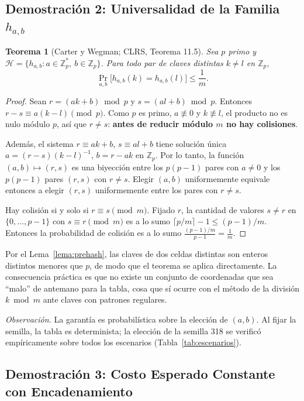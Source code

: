 \documentclass[11pt,a4paper]{article}
\newtheorem{teorema}{Teorema}
\theoremstyle{definition}
\begin{document}
\subsection{Demostración 2: Universalidad de la Familia $h_{a,b}$}

\begin{teorema}[Carter y Wegman; CLRS, Teorema 11.5]\label{teo:universal}
Sea $p$ primo y $\mathcal{H}=\{h_{a,b} : a\in\mathbb{Z}_p^\ast,\ b\in\mathbb{Z}_p\}$. Para todo par de claves distintas $k\neq l$ en $\mathbb{Z}_p$,
\[ \Pr_{a,b}\bigl[h_{a,b}(k)=h_{a,b}(l)\bigr]\le\frac{1}{m}. \]
\end{teorema}
\begin{proof}
Sean $r=(ak+b)\bmod p$ y $s=(al+b)\bmod p$. Entonces $r-s\equiv a(k-l)\pmod p$. Como $p$ es primo, $a\not\equiv0$ y $k\not\equiv l$, el producto no es nulo módulo $p$, así que $r\neq s$: \textbf{antes de reducir módulo $m$ no hay colisiones}.

Además, el sistema $r\equiv ak+b$, $s\equiv al+b$ tiene solución única $a=(r-s)(k-l)^{-1}$, $b=r-ak$ en $\mathbb{Z}_p$. Por lo tanto, la función $(a,b)\mapsto(r,s)$ es una biyección entre los $p(p-1)$ pares con $a\neq0$ y los $p(p-1)$ pares $(r,s)$ con $r\neq s$. Elegir $(a,b)$ uniformemente equivale entonces a elegir $(r,s)$ uniformemente entre los pares con $r\ne s$.

Hay colisión si y solo si $r\equiv s\pmod m$. Fijado $r$, la cantidad de valores $s\neq r$ en $\{0,\dots,p-1\}$ con $s\equiv r\pmod m$ es a lo sumo $\lceil p/m\rceil-1\le (p-1)/m$. Entonces la probabilidad de colisión es a lo sumo $\frac{(p-1)/m}{p-1}=\frac1m$.
\end{proof}

Por el Lema~\ref{lema:prehash}, las claves de dos celdas distintas son enteros distintos menores que $p$, de modo que el teorema se aplica directamente. La consecuencia práctica es que no existe un conjunto de coordenadas que sea ``malo'' de antemano para la tabla, cosa que sí ocurre con el método de la división $k\bmod m$ ante claves con patrones regulares.

\textit{Observación.} La garantía es probabilística sobre la elección de $(a,b)$. Al fijar la semilla, la tabla es determinista; la elección de la semilla 318 se verificó empíricamente sobre todos los escenarios (Tabla~\ref{tab:escenarios}).

\subsection{Demostración 3: Costo Esperado Constante con Encadenamiento}
\end{document}
